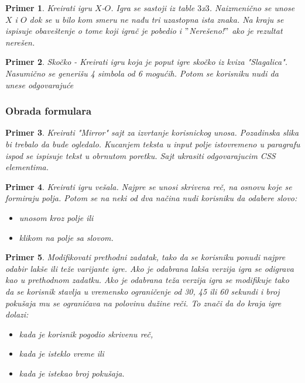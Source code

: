 \documentclass[a4paper]{article}
\newtheorem{primer}{Primer}[section]
\begin{document}
\begin{primer}
Kreirati igru $X$-$O$. Igra se sastoji iz table $3$x$3$. Naizmenično se unose $X$ i $O$ dok se u bilo kom smeru ne nađu tri uzastopna ista znaka. Na kraju se ispisuje obaveštenje o tome koji igrač je pobedio i $"$Nerešeno!$"$ ako je rezultat nerešen.
\end{primer}


\begin{primer}
Skočko - Kreirati igru koja je poput igre skočko iz kviza "Slagalica". Nasumično se generišu 4 simbola od 6 mogućih. Potom se korisniku nudi da unese odgovarajuće
\end{primer}


\subsubsection{Obrada formulara}

\begin{primer}
Kreirati "Mirror" sajt za izvrtanje korisnickog unosa. Pozadinska slika bi trebalo da bude
ogledalo. Kucanjem teksta u input polje istovremeno u paragrafu ispod se ispisuje tekst u 
obrnutom poretku. Sajt ukrasiti odgovarajucim CSS elementima.
\end{primer}

\begin{primer}
Kreirati igru vešala. Najpre se unosi skrivena reč, na osnovu koje se formiraju polja. Potom se na neki od dva načina nudi korisniku da odabere slovo:
\begin{itemize}
\item unosom kroz polje ili
\item klikom na polje sa slovom.
\end{itemize}

\end{primer}

\begin{primer}
Modifikovati prethodni zadatak, tako da se korisniku ponudi najpre odabir lakše ili teže varijante igre. Ako je odabrana lakša verzija igra se odigrava kao u prethodnom zadatku.  Ako je odabrana teža verzija igra se modifikuje tako da se korisnik stavlja u vremensko ograničenje od 30, 45 ili 60 sekundi i broj pokušaja mu se ograničava na polovinu dužine reči. To znači da do kraja igre dolazi:
\begin{itemize}
\item kada je korisnik pogodio skrivenu reč,
\item kada je isteklo vreme ili
\item kada je istekao broj pokušaja.
\end{itemize}
\end{primer}
\end{document}
